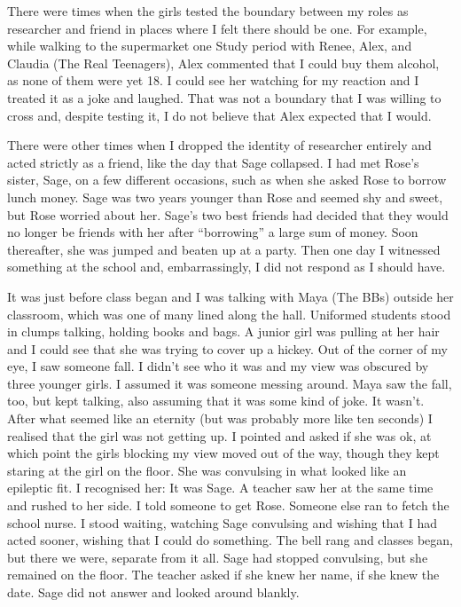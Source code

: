 There were times when the girls tested the boundary between my roles as researcher and friend in places where I felt there should be one. For example, while walking to the supermarket one Study period with Renee, Alex, and Claudia (The Real Teenagers), Alex commented that I could buy them alcohol, as none of them were yet 18. I could see her watching for my reaction and I treated it as a joke and laughed. That was not a boundary that I was willing to cross and, despite testing it, I do not believe that Alex expected that I would.



There were other times when I dropped the identity of researcher entirely and acted strictly as a friend, like the day that Sage collapsed. I had met Rose's sister, Sage, on a few different occasions, such as when she asked Rose to borrow lunch money. Sage was two years younger than Rose and seemed shy and sweet, but Rose worried about her. Sage's two best friends had decided that they would no longer be friends with her after ``borrowing'' a large sum of money. Soon thereafter, she was jumped and beaten up at a party. Then one day I witnessed something at the school and, embarrassingly, I did not respond as I should have. 

It was just before class began and I was talking with Maya (The BBs) outside her classroom, which was one of many lined along the hall. Uniformed students stood in clumps talking, holding books and bags. A junior girl was pulling at her hair and I could see that she was trying to cover up a hickey. Out of the corner of my eye, I saw someone fall. I didn't see who it was and my view was obscured by three younger girls. I assumed it was someone messing around. Maya saw the fall, too, but kept talking, also assuming that it was some kind of joke. It wasn't. After what seemed like an eternity (but was probably more like ten seconds) I realised that the girl was not getting up. I pointed and asked if she was ok, at which point the girls blocking my view moved out of the way, though they kept staring at the girl on the floor. She was convulsing in what looked like an epileptic fit. I recognised her: It was Sage. A teacher saw her at the same time and rushed to her side. I told someone to get Rose. Someone else ran to fetch the school nurse. I stood waiting, watching Sage convulsing and wishing that I had acted sooner, wishing that I could do something. The bell rang and classes began, but there we were, separate from it all. Sage had stopped convulsing, but she remained on the floor. The teacher asked if she knew her name, if she knew the date. Sage did not answer and looked around blankly. 

